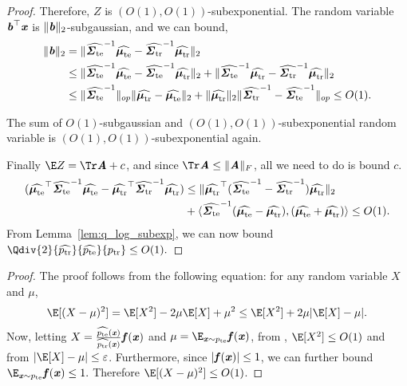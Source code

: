 \begin{proof}
    
    Therefore, $Z$ is $(O(1), O(1))$-subexponential. The random variable $\bb^{\top} \xx$ is $\|\bb\|_2$-subgaussian, and we can bound,
    \begin{align*}
        \|\bb\|_2 & = \|\widehat{\ste}^{-1} \widehat{\mte} - \widehat{\str}^{-1} \widehat{\mtr}\|_2 \\
        &\leq \|\widehat{\ste}^{-1} \widehat{\mte} - \widehat{\ste}^{-1} \widehat{\mtr}\|_2+\|\widehat{\ste}^{-1} \widehat{\mtr} - \widehat{\str}^{-1} \widehat{\mtr}\|_2\\
        & \leq\|\widehat{\ste}^{-1}\|_{op}\|\widehat{\mtr} - \widehat{\mte}\|_2  + \|\widehat{\mtr}\|_2 \|\widehat{\str}^{-1} - \widehat{\ste}^{-1}\|_{op}\leq O(1).
    \end{align*}

    The sum of $O(1)$-subgaussian and $(O(1), O(1))$-subexponential random variable is $(O(1), O(1))$-subexponential again.

    Finally $\E Z = \Tr \AA + c$, and since $\Tr \AA \leq \|\AA\|_F$, all we need to do is bound $c$.
    \begin{align*}
        (\widehat{\mte}^{\top} \widehat{\ste}^{-1} \widehat{\mte} - \widehat{\mtr}^{\top} \widehat{\str}^{-1} \widehat{\mtr}) & \leq
        \|\widehat{\mtr}^{\top} (\widehat{\ste}^{-1} - \widehat{\str}^{-1}) \widehat{\mtr}\|_2 \\
        &+ \langle \widehat{\ste}^{-1}(\widehat{\mte} - \widehat{\mtr}), (\widehat{\mte}+ \widehat{\mtr}) \rangle \leq O(1) .
    \end{align*}
    From Lemma~\ref{lem:q_log_subexp}, we can now bound $\Qdiv{2}{\widehat{\ptr}}{\widehat{\pte}}{\ptr} \leq O(1).$
\end{proof}

\VarianceGauss*

\begin{proof}
    The proof follows from the following equation: for any random variable $X$ and $\mu$,
    \[
    \E[(X-\mu)^2] = \E[X^2] -2\mu\E[X] + \mu^2 \leq \E[X^2] + 2\mu|\E[X]-\mu|.
    \]
    Now, letting $X = \frac{\widehat{\pte}(\xx)}{\widehat{\ptr}(\xx)}\ff(\xx)$ and $\mu = \E_{\xx\sim\pte}\ff(\xx)$, from , $\E[X^2] \leq O(1)$ and from  $|\E[X]-\mu|\leq \varepsilon$. Furthermore, since $|\ff(\xx)|\leq 1$, we can further bound $\E_{\xx\sim\pte}\ff(\xx)\leq 1.$ Therefore $\E[(X-\mu)^2]\leq O(1)$.
\end{proof}

